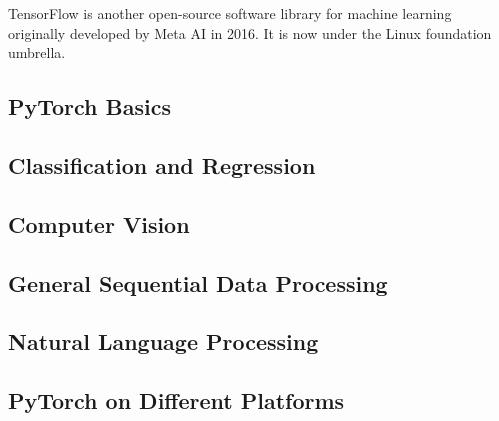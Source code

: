 TensorFlow is another open-source software library for machine learning originally developed by Meta AI in 2016. It is now under the Linux foundation umbrella.

\subsection{PyTorch Basics}

\subsection{Classification and Regression}

\subsection{Computer Vision}

\subsection{General Sequential Data Processing}

\subsection{Natural Language Processing}

\subsection{PyTorch on Different Platforms}

